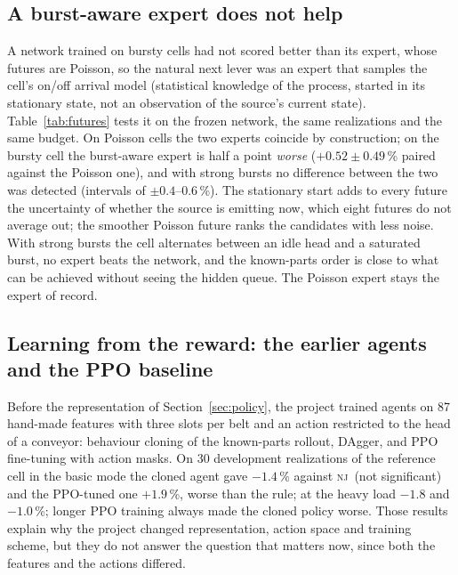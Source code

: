 \documentclass[11pt,a4paper]{article}
\theoremstyle{plain}
\theoremstyle{definition}
\theoremstyle{remark}
\newcommand{\nj}{\textsc{nj}}
\begin{document}
\subsection{A burst-aware expert does not help}\label{sec:futures}
A network trained on bursty cells had not scored better than its expert, whose futures
are Poisson, so the natural next lever was an expert that samples the cell's on/off arrival model
(statistical knowledge of the process, started in its stationary state, not an
observation of the source's current state). Table~\ref{tab:futures} tests it on the
frozen network, the same realizations and the same budget. On Poisson cells the two
experts coincide by construction; on the bursty cell the burst-aware expert is half a
point \emph{worse} ($+0.52\pm0.49$\,\% paired against the Poisson one), and with strong
bursts no difference between the two was detected (intervals of $\pm0.4$--$0.6$\,\%). The stationary start adds to
every future the uncertainty of whether the source is emitting now, which eight futures
do not average out; the smoother Poisson future ranks the candidates with less noise. With
strong bursts the cell alternates between an idle head and a saturated burst, no expert
beats the network, and the known-parts order is close to what can be achieved without
seeing the hidden queue. The Poisson expert stays the expert of record.

\begin{table}[t]
\centering\small
\caption{Expert futures: the frozen network alone, and the scenario search over it with
Poisson futures and with the cell's on/off arrival model, on the validation groups
(design mode, 50 realizations per group, 100 general) and on two cells with strong
bursts (on 20\,\% of the time in 40~s periods). Paired $\Delta$ vs \nj\ [\%, 95\,\% CI]. Legacy tie-break.}
\label{tab:futures}
\resizebox{\linewidth}{!}{}
\end{table}

\subsection{Learning from the reward: the earlier agents and the PPO baseline}\label{sec:rlhistory}
Before the representation of Section~\ref{sec:policy}, the project trained agents on 87
hand-made features with three slots per belt and an action restricted to the head of a
conveyor: behaviour cloning of the known-parts rollout, DAgger, and PPO fine-tuning with
action masks. On 30 development realizations of the reference cell in the basic mode the
cloned agent gave $-1.4$\,\% against \nj\ (not significant) and the PPO-tuned one
$+1.9$\,\%, worse than the rule; at the heavy load $-1.8$ and $-1.0$\,\%; longer PPO
training always made the cloned policy worse. Those results explain why the project
changed representation, action space and training scheme, but they do not answer the
question that matters now, since both the features and the actions differed.
\end{document}
